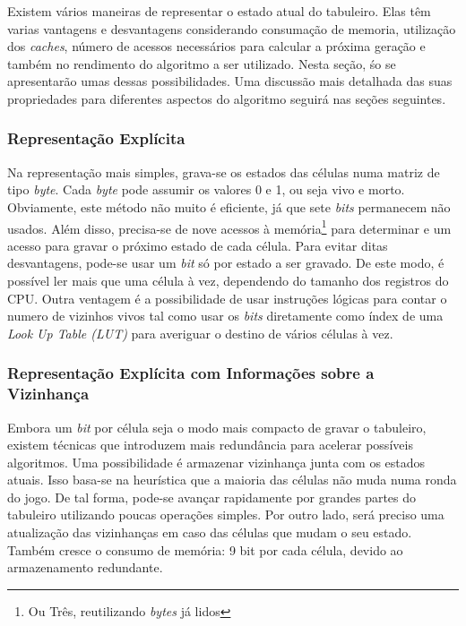 Existem vários maneiras de representar o estado atual do tabuleiro. Elas têm varias vantagens e desvantagens considerando consumação de memoria, utilização dos \textit{caches}, número de acessos necessários para calcular a próxima geração e também no rendimento do algoritmo a ser utilizado. Nesta seção, śo se apresentarão umas dessas possibilidades. Uma discussão mais detalhada das suas propriedades para diferentes aspectos do algoritmo seguirá nas seções seguintes.\\

\subsubsection{Representação Explícita}
Na representação mais simples, grava-se os estados das células numa matriz de tipo \textit{byte}. Cada \textit{byte} pode assumir os valores 0 e 1, ou seja vivo e morto. Obviamente, este método não muito é eficiente, já que sete \textit{bits} permanecem não usados. Além disso, precisa-se de nove acessos à memória\footnote{Ou Três, reutilizando \textit{bytes} já lidos} para determinar e um acesso para gravar o próximo estado de cada célula. Para evitar ditas desvantagens, pode-se usar um \textit{bit} só por estado a ser gravado. De este modo, é possível ler mais que uma célula à vez, dependendo do tamanho dos registros do CPU. Outra ventagem é a possibilidade de usar instruções lógicas  para contar o numero de vizinhos vivos tal como usar os \textit{bits} diretamente como índex de uma \textit{Look Up Table (LUT)} para averiguar o destino de vários células à vez.\\

\subsubsection{Representação Explícita com Informações sobre a Vizinhança}
Embora um \textit{bit} por célula seja o modo mais compacto de gravar o tabuleiro, existem técnicas que introduzem mais redundância para acelerar possíveis algoritmos. Uma possibilidade é armazenar vizinhança junta com os estados atuais. Isso basa-se na heurística que a maioria das células não muda numa ronda do jogo. De tal forma, pode-se avançar rapidamente por grandes partes do tabuleiro utilizando poucas operações simples. Por outro lado, será preciso uma atualização das vizinhanças em caso das células que mudam o seu estado. Também cresce o consumo de memória: 9 bit por cada célula, devido ao armazenamento redundante.\\


